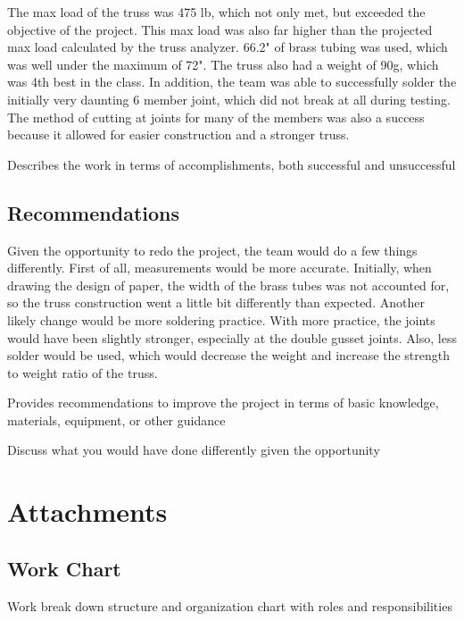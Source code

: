 \documentclass{article}
\let\Oldsection\section
\renewcommand{\section}{\FloatBarrier\Oldsection}
\let\Oldsubsection\subsection
\renewcommand{\subsection}{\FloatBarrier\Oldsubsection}
\begin{document}
The max load of the truss was 475 lb, which not only met, but exceeded the objective of the project. This max load was also far higher than the projected max load calculated by the truss analyzer. 66.2" of brass tubing was used, which was well under the maximum of 72". The truss also had a weight of 90g, which was 4th best in the class. In addition, the team was able to successfully solder the initially very daunting 6 member joint, which did not break at all during testing. The method of cutting at joints for many of the members was also a success because it allowed for easier construction and a stronger truss.

Describes the work in terms of accomplishments, both successful and unsuccessful

\subsection{Recommendations}

Given the opportunity to redo the project, the team would do a few things differently. First of all, measurements would be more accurate. Initially, when drawing the design of paper, the width of the brass tubes was not accounted for, so the truss construction went a little bit differently than expected. Another likely change would be more soldering practice. With more practice, the joints would have been slightly stronger, especially at the double gusset joints. Also, less solder would be used, which would decrease the weight and increase the strength to weight ratio of the truss.

Provides recommendations to improve the project in terms of basic knowledge, materials, equipment, or other guidance

Discuss what you would have done differently given the opportunity

\newpage

\section{Attachments}

\subsection{Work Chart}

Work break down structure and organization chart with roles and responsibilities
\end{document}
